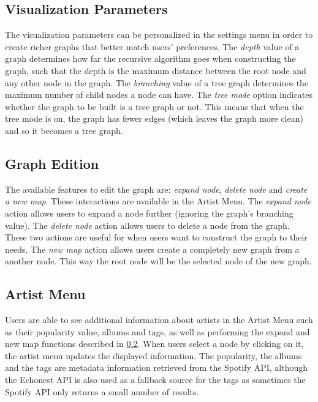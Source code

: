 \documentclass{article}
\begin{document}
    \subsection{Visualization Parameters}
    \label{sub:visualization_parameters}

      The visualization parameters can be personalized in the settings menu in order to create richer graphs that better match users' preferences.
      The \textit{depth} value of a graph determines how far the recursive algorithm goes when constructing the graph, such that the depth is the maximum distance between the root node and any other node in the graph.
      The \textit{branching} value of a tree graph determines the maximum number of child nodes a node can have.
      The \textit{tree mode} option indicates whether the graph to be built is a tree graph or not.
      This means that when the tree mode is on, the graph has fewer edges (which leaves the graph more clean) and so it becomes a tree graph.

    \subsection{Graph Edition}
    \label{sub:graph_edition}
      
      The available features to edit the graph are: \textit{expand node}, \textit{delete node} and \textit{create a new map}. These interactions are available in the Artist Menu.
      The \textit{expand node} action allows users to expand a node further (ignoring the graph's branching value).
      The \textit{delete node} action allows users to delete a node from the graph.
      These two actions are useful for when users want to construct the graph to their needs.
      The \emph{new map} action allows users create a completely new graph from a another node. This way the root node will be the selected node of the new graph.

    \subsection{Artist Menu}
    \label{sub:artist_menu}
    
      Users are able to see additional information about artists in the Artist Menu such as their popularity value, albums and tags, as well as performing the expand and new map functions described in \ref{sub:graph_edition}.
      When users select a node by clicking on it, the artist menu updates the displayed information.
      The popularity, the albums and the tags are metadata information retrieved from the Spotify API, although the Echonest API\cite{echonestdev} is also used as a fallback source for the tags  as sometimes the Spotify API only returns a small number of results.
\end{document}
